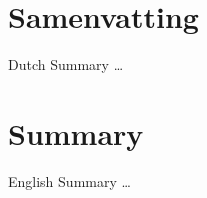 \chapter*[Dutch Summary]{Samenvatting}
{\summaryfont
%
Dutch Summary \ldots
%
}

\chapter*[English Summary]{Summary}
{\summaryfont
%
English Summary \ldots
%
}
